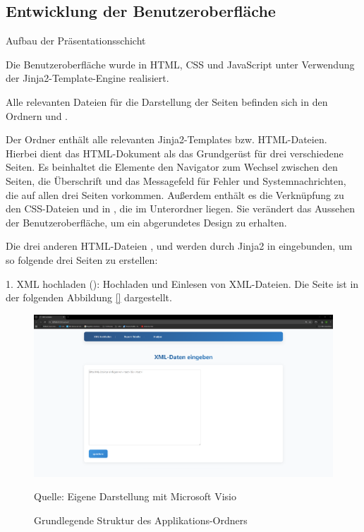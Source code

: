 \subsection{Entwicklung der Benutzeroberfläche}
\label{subsec:entwicklung-der-benutzeroberflache}
Aufbau der Präsentationsschicht


Die Benutzeroberfläche wurde in HTML, CSS und JavaScript unter Verwendung der Jinja2-Template-Engine realisiert.

Alle relevanten Dateien für die Darstellung der Seiten befinden sich in den Ordnern  und .

Der Ordner  enthält alle relevanten Jinja2-Templates bzw. HTML-Dateien.
Hierbei dient das HTML-Dokument  als das Grundgerüst für drei verschiedene Seiten.
Es beinhaltet die Elemente den Navigator zum Wechsel zwischen den Seiten, die Überschrift und das Messagefeld für Fehler und Systemnachrichten, die auf allen drei Seiten vorkommen.
Außerdem enthält es die Verknüpfung zu den CSS-Dateien  und  in , die im Unterordner  liegen.
Sie verändert das Aussehen der Benutzeroberfläche, um ein abgerundetes Design zu erhalten.

Die drei anderen HTML-Dateien ,  und  werden durch Jinja2 in  eingebunden, um so folgende drei Seiten zu erstellen:

1. XML hochladen (): Hochladen und Einlesen von XML-Dateien.
Die Seite ist in der folgenden Abbildung \ref{} dargestellt.

\begin{figure}[H]
    \centering
    \includegraphics[width=1\textwidth]{Grafiken/Bild XML hochladen.png}
    \caption{Grundlegende Struktur des Applikations-Ordners}
    \label{fig: 4545}
    {Quelle: Eigene Darstellung mit Microsoft Visio}
\end{figure}

